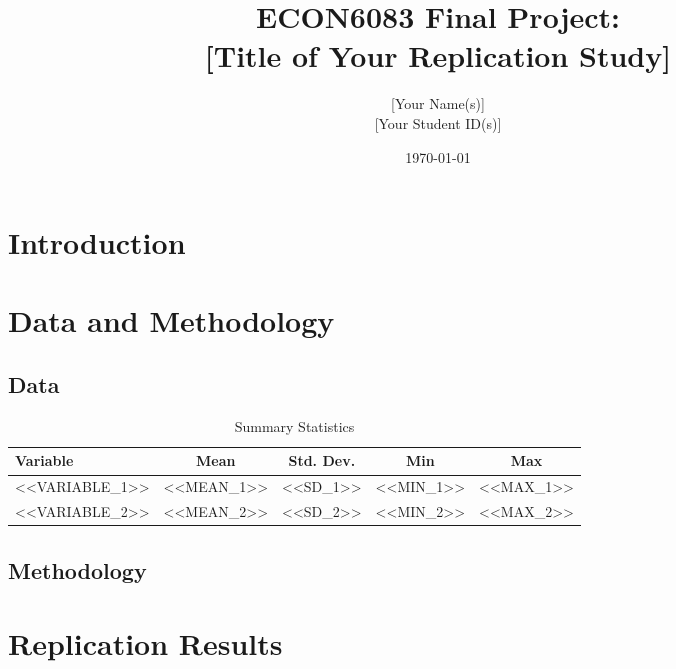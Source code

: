 \documentclass[12pt]{article}
\title{ECON6083 Final Project: \\
\large [Title of Your Replication Study]}
\author{[Your Name(s)] \\ {[Your Student ID(s)]}}
\date{\today}
\begin{document}
\maketitle

\begin{abstract}
\end{abstract}

\section{Introduction}


\section{Data and Methodology}

\subsection{Data}

\begin{table}[h!]
\centering
\caption{Summary Statistics}
\label{tab:summary}
\begin{tabular}{lcccc}
\toprule
Variable & Mean & Std. Dev. & Min & Max \\
\midrule
<<VARIABLE_1>> & <<MEAN_1>> & <<SD_1>> & <<MIN_1>> & <<MAX_1>> \\
<<VARIABLE_2>> & <<MEAN_2>> & <<SD_2>> & <<MIN_2>> & <<MAX_2>> \\
\bottomrule
\end{tabular}
\end{table}

\subsection{Methodology}

\section{Replication Results}
\end{document}
